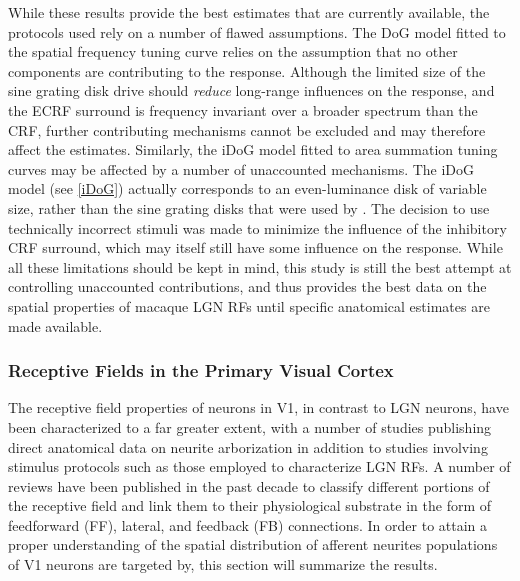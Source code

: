 While these results provide the best estimates that are currently
available, the protocols used rely on a number of flawed
assumptions. The DoG model fitted to the spatial frequency tuning
curve relies on the assumption that no other components are
contributing to the response. Although the limited size of the sine
grating disk drive should \emph{reduce} long-range influences on the
response, and the ECRF surround is frequency invariant over a broader
spectrum than the CRF, further contributing mechanisms cannot be
excluded and may therefore affect the estimates. Similarly, the iDoG
model fitted to area summation tuning curves may be affected by a
number of unaccounted mechanisms. The iDoG model (see \ref{iDoG})
actually corresponds to an even-luminance disk of variable size,
rather than the sine grating disks that were used by
\cite{Sceniak2006}. The decision to use technically incorrect stimuli
was made to minimize the influence of the inhibitory CRF surround,
which may itself still have some influence on the response.  While all
these limitations should be kept in mind, this study is still the best
attempt at controlling unaccounted contributions, and thus provides
the best data on the spatial properties of macaque LGN RFs until
specific anatomical estimates are made available.

\subsubsection{Receptive Fields in the Primary Visual Cortex}

The receptive field properties of neurons in V1, in contrast to LGN
neurons, have been characterized to a far greater extent, with a number
of studies publishing direct anatomical data on neurite arborization
in addition to studies involving stimulus protocols such as those
employed to characterize LGN RFs. A number of reviews have been
published in the past decade to classify different portions of the
receptive field and link them to their physiological substrate in the
form of feedforward (FF), lateral, and feedback (FB) connections. In
order to attain a proper understanding of the spatial distribution of
afferent neurites populations of V1 neurons are targeted by, this
section will summarize the results.

